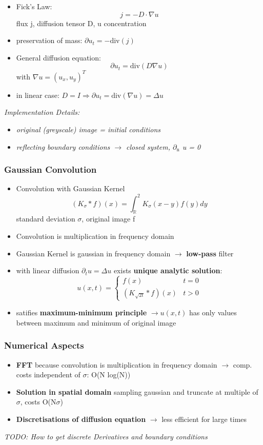 \documentclass[11pt]{article}
\begin{document}
\begin{itemize}
\item Fick's Law:
$$ j = -D \cdot \nabla u $$
flux j, diffusion tensor D, u concentration
\item preservation of mass: $\partial u_t = -\text{div}(j)$
\item General diffusion equation:
$$ \partial u_t = \text{div}(D \nabla u) $$
with $\nabla u = (u_x, u_y)^T$
\item in linear case: $D = I \Rightarrow \partial u_t = \text{div}(\nabla u) = \Delta u$
\end{itemize}
\emph{Implementation Details:}
\begin{itemize}
\item \emph{original (greyscale) image = initial conditions}
\item \emph{reflecting boundary conditions $\rightarrow$ closed system, $\partial$$_{\text{n}}$ u = 0}
\end{itemize}

\subsubsection{Gaussian Convolution}
\label{sec-2-1-1}
\begin{itemize}
\item Convolution with Gaussian Kernel
$$ (K_\sigma * f)(x) = \int_{\mathbb{R}}^2 K_\sigma(x-y)f(y)dy $$
standard deviation $\sigma$, original image f
\item Convolution is multiplication in frequency domain
\item Gaussian Kernel is gaussian in frequency domain $\rightarrow$ \textbf{low-pass} filter
\item with linear diffusion $\partial_t u = \Delta u$ exists \textbf{unique analytic solution}:
      $$ u(x,t) = \begin{cases}f(x) & t=0 \\ (K_{\sqrt{2t}}*f)(x) & t>0 \end{cases} $$
\item satifies \textbf{maximum-minimum principle} $\rightarrow u(x,t)$ has only values between
maximum and minimum of original image
\end{itemize}
\subsubsection{Numerical Aspects}
\label{sec-2-1-2}
\begin{itemize}
\item \textbf{FFT} because convolution is multiplication in frequency domain $\rightarrow$ 
comp. costs independent of $\sigma$: O(N log(N))
\item \textbf{Solution in spatial domain} sampling gaussian and truncate at multiple of $\sigma$,
costs O(N$\sigma$)
\item \textbf{Discretisations of diffusion equation} $\rightarrow$ less efficient for large times
\end{itemize}
\emph{TODO: How to get discrete Derivatives and boundary conditions}
\end{document}
